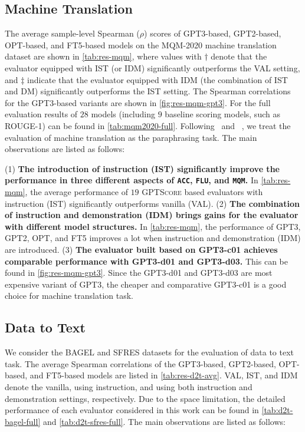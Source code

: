 \subsection{Machine Translation}

The average sample-level Spearman ($\rho$) scores of GPT3-based, GPT2-based, OPT-based, and FT5-based models on the MQM-2020 machine translation dataset are shown in \autoref{tab:res-mqm}, where values with $\dag$ denote that the evaluator equipped with IST (or IDM) significantly outperforms the VAL setting, and 
$\ddag$ indicate that the evaluator equipped with IDM (the combination of IST and DM) significantly outperforms the IST setting. The Spearman correlations for the GPT3-based variants are shown in \autoref{fig:res-mqm-gpt3}. 
For the full evaluation results of $28$ models (including $9$ baseline scoring models, such as ROUGE-1) can be found in \autoref{tab:mqm2020-full}.
Following~\citet{prism:brian} and ~\citet{bartscore2021yuan}, we treat the evaluation of machine translation as the paraphrasing task. The main observations are listed as follows:

    (1) \textbf{The introduction of instruction (IST) significantly improve the performance in three different aspects of \texttt{ACC}, \texttt{FLU}, and \texttt{MQM}.} In \autoref{tab:res-mqm}, the average performance of $19$ \textsc{GPTScore} based evaluators with instruction (IST) significantly outperforms vanilla (VAL). (2) \textbf{The combination of instruction and demonstration (IDM) brings gains for the evaluator with different model structures.} In \autoref{tab:res-mqm}, the performance of GPT3, GPT2, OPT, and FT5  improves a lot when instruction and demonstration (IDM) are introduced. (3)  \textbf{The evaluator built based on GPT3-c01 achieves comparable performance with GPT3-d01 and GPT3-d03.} This can be found in \autoref{fig:res-mqm-gpt3}.
    Since the GPT3-d01 and GPT3-d03 are most expensive variant of GPT3, the cheaper and comparative GPT3-c01 is a good choice for machine translation task.  

\subsection{Data to Text} We consider the BAGEL and SFRES datasets for the evaluation of data to text task. The average Spearman correlations of the GPT3-based, GPT2-based, OPT-based, and FT5-based models are listed in \autoref{tab:res-d2t-avg}. VAL, IST, and IDM denote the vanilla, using instruction, and using both instruction and demonstration settings, respectively. Due to the space limitation, the detailed performance of each evaluator considered in this work can be found in \autoref{tab:d2t-bagel-full} and \autoref{tab:d2t-sfres-full}. 
The main observations are listed as follows:

